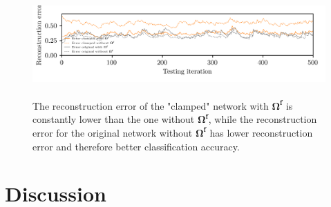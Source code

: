 \documentclass[twoside,11pt,titlepage]{article}
\begin{document}
\begin{figure}[!htb]
  \includegraphics[width = \columnwidth, height=4cm]{figures/figure10.png}
  \caption{The reconstruction error of the "clamped" network with $\mathbf{\Omega^f}$ is constantly lower than the one
  without $\mathbf{\Omega^f}$, while the reconstruction error for the original network without $\mathbf{\Omega^f}$
  has lower reconstruction error and therefore better classification accuracy.}
  \label{fig:figure10}
\end{figure}

\clearpage

\section{Discussion}

\clearpage

\vskip 0.2in

\end{document}
